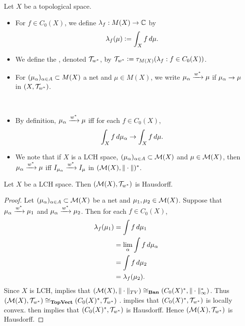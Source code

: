 \documentclass{book}
\begin{document}
	\begin{defn} 
		Let $X$ be a topological space. 
		\begin{itemize}
			\item For $f \in C_0(X)$, we define $\lambda_f: M(X) \rightarrow \mathbb{C}$ by 
			$$\lambda_f(\mu) \vcentcolon= \int_X f \, d \mu.$$
			\item We define the , denoted $\mathcal{T}_{w^*}$, by $\mathcal{T}_{w^*} \vcentcolon= \tau_{M(X)}(\lambda_f: f \in C_0(X))$.  
			\item For $(\mu_{\alpha})_{\alpha \in A} \subset M(X)$ a net and $\mu \in M(X)$, we write $\mu_{\alpha} \xrightarrow{w^*} \mu$ if $\mu_{\alpha} \rightarrow \mu$ in $(X, \mathcal{T}_{w^*})$.
		\end{itemize}
	\end{defn}
	
	\begin{note}\
		\begin{itemize}
			\item By definition, $\mu_{\alpha} \xrightarrow{w^*} \mu$ iff for each $f \in C_0(X)$, 
			$$\int_X f \, d \mu_{\alpha} \rightarrow \int_X f \, d \mu.$$
			\item We note that if $X$ is a LCH space, $(\mu_{\alpha})_{\alpha \in A} \subset \mathcal{M}(X)$ and $\mu \in \mathcal{M}(X)$, then $\mu_{\alpha} \xrightarrow{w^*} \mu$ iff $I_{\mu_{\alpha}} \xrightarrow{w^*} I_{\mu}$ in $(\mathcal{M}(X), \|\cdot\|)^*$.
		\end{itemize}
	\end{note}
	
	\begin{ex} 
		Let $X$ be a LCH space. Then $(\mathcal{M}(X), \mathcal{T}_{w^*})$ is Hausdorff.
	\end{ex}
	
	\begin{proof}
		Let $(\mu_{\alpha})_{\alpha \in A} \subset \mathcal{M}(X)$ be a net and $\mu_1, \mu_2 \in \mathcal{M}(X)$. Suppose that $\mu_{\alpha} \xrightarrow{w^*} \mu_1$ and $\mu_{\alpha} \xrightarrow{w^*} \mu_2$. Then for each $f \in C_0(X)$, 
		\begin{align*}
			\lambda_f(\mu_1)
			& = \int f \, d \mu_1 \\
			& = \lim\limits_{\alpha} \int f \, d \mu_{\alpha} \\
			& = \int f \, d \mu_2 \\
			& = \lambda_f(\mu_2).
		\end{align*} 
		Since $X$ is LCH,  implies that $(\mathcal{M}(X), \|\cdot\|_{TV}) \cong_{\operatorname*{\text{\textbf{Ban}}}} (C_0(X)^*, \|\cdot\|_{\infty}^*)$. Thus $(\mathcal{M}(X), \mathcal{T}_{w^*}) \cong_{\operatorname*{\text{\textbf{TopVect}}}} (C_0(X)^*, \mathcal{T}_{w^*})$ .  implies that $(C_0(X)^*, \mathcal{T}_{w^*})$ is locally convex. \rex{}  then implies that $(C_0(X)^*, \mathcal{T}_{w^*})$ is Hausdorff. Hence $(\mathcal{M}(X), \mathcal{T}_{w^*})$ is Hausdorff.
	\end{proof}
	
\end{document}
